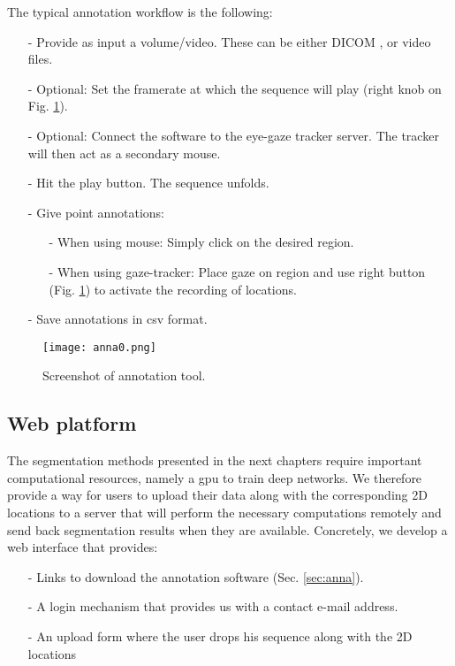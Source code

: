 The typical annotation workflow is the following:

\begin{itemize}
  \item[-]{Provide as input a volume/video. These can be either DICOM \cite{dicom}, or video files.}
  \item[-]{Optional: Set the framerate at which the sequence will play (right knob on Fig. \ref{fig:anna}).}
  \item[-]{Optional: Connect the software to the eye-gaze tracker server. The tracker will then act as a secondary mouse.}
  \item[-]{Hit the play button. The sequence unfolds.}
  \item[-]{Give point annotations:}
    \begin{itemize}
      \item[-]{When using mouse: Simply click on the desired region.}
      \item[-]{When using gaze-tracker: Place gaze on region and use right button (Fig. \ref{fig:anna}) to activate the recording of locations.}
    \end{itemize}
  \item[-]{Save annotations in \gls{csv} format.}
\end{itemize}

\begin{figure}[!htpb]
  \texttt{[image: anna0.png]}
  \caption{Screenshot of annotation tool. }
  \label{fig:anna}
\end{figure}


\subsection{Web platform}
The segmentation methods presented in the next chapters require important computational resources, namely a \gls{gpu} to train deep networks.
We therefore provide a way for users to upload their data along with the corresponding 2D locations to a server that will perform the necessary computations remotely and send back segmentation results when they are available.
Concretely, we develop a web interface that provides:

\begin{itemize}
  \item[-]{Links to download the annotation software (Sec. \ref{sec:anna}).}
  \item[-]{A login mechanism that provides us with a contact e-mail address.}
  \item[-]{An upload form where the user drops his sequence along with the 2D locations}
\end{itemize}

